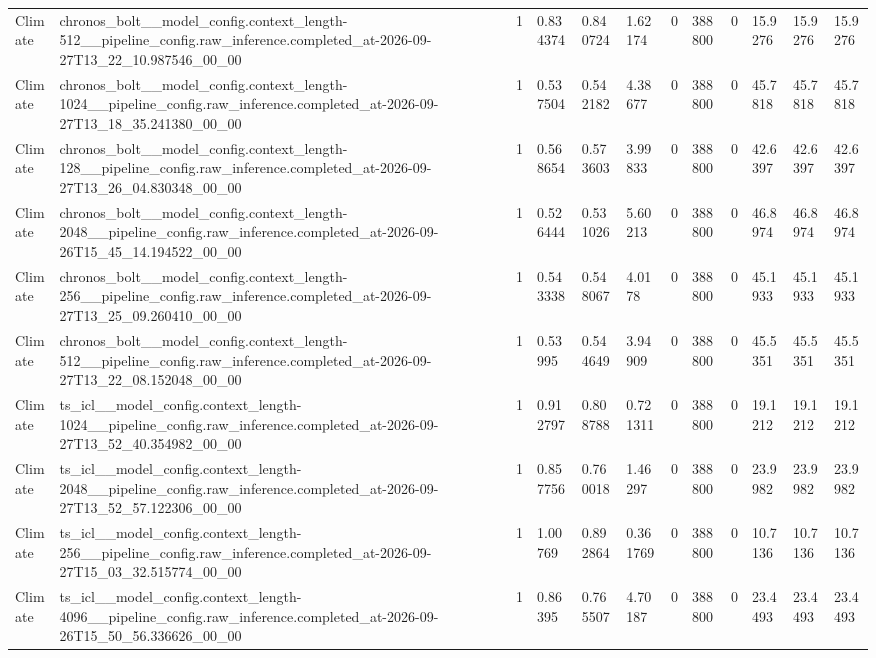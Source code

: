 \begin{tabular}{llllllllllll}
Climate & chronos\_bolt\_\_model\_config.context\_length-512\_\_pipeline\_config.raw\_inference.completed\_at-2026-09-27T13\_22\_10.987546\_00\_00 & 1 & 0.834374 & 0.840724 & 1.62174 & 0 & 388800 & 0 & 15.9276 & 15.9276 & 15.9276 \\
Climate & chronos\_bolt\_\_model\_config.context\_length-1024\_\_pipeline\_config.raw\_inference.completed\_at-2026-09-27T13\_18\_35.241380\_00\_00 & 1 & 0.537504 & 0.542182 & 4.38677 & 0 & 388800 & 0 & 45.7818 & 45.7818 & 45.7818 \\
Climate & chronos\_bolt\_\_model\_config.context\_length-128\_\_pipeline\_config.raw\_inference.completed\_at-2026-09-27T13\_26\_04.830348\_00\_00 & 1 & 0.568654 & 0.573603 & 3.99833 & 0 & 388800 & 0 & 42.6397 & 42.6397 & 42.6397 \\
Climate & chronos\_bolt\_\_model\_config.context\_length-2048\_\_pipeline\_config.raw\_inference.completed\_at-2026-09-26T15\_45\_14.194522\_00\_00 & 1 & 0.526444 & 0.531026 & 5.60213 & 0 & 388800 & 0 & 46.8974 & 46.8974 & 46.8974 \\
Climate & chronos\_bolt\_\_model\_config.context\_length-256\_\_pipeline\_config.raw\_inference.completed\_at-2026-09-27T13\_25\_09.260410\_00\_00 & 1 & 0.543338 & 0.548067 & 4.0178 & 0 & 388800 & 0 & 45.1933 & 45.1933 & 45.1933 \\
Climate & chronos\_bolt\_\_model\_config.context\_length-512\_\_pipeline\_config.raw\_inference.completed\_at-2026-09-27T13\_22\_08.152048\_00\_00 & 1 & 0.53995 & 0.544649 & 3.94909 & 0 & 388800 & 0 & 45.5351 & 45.5351 & 45.5351 \\
Climate & ts\_icl\_\_model\_config.context\_length-1024\_\_pipeline\_config.raw\_inference.completed\_at-2026-09-27T13\_52\_40.354982\_00\_00 & 1 & 0.912797 & 0.808788 & 0.721311 & 0 & 388800 & 0 & 19.1212 & 19.1212 & 19.1212 \\
Climate & ts\_icl\_\_model\_config.context\_length-2048\_\_pipeline\_config.raw\_inference.completed\_at-2026-09-27T13\_52\_57.122306\_00\_00 & 1 & 0.857756 & 0.760018 & 1.46297 & 0 & 388800 & 0 & 23.9982 & 23.9982 & 23.9982 \\
Climate & ts\_icl\_\_model\_config.context\_length-256\_\_pipeline\_config.raw\_inference.completed\_at-2026-09-27T15\_03\_32.515774\_00\_00 & 1 & 1.00769 & 0.892864 & 0.361769 & 0 & 388800 & 0 & 10.7136 & 10.7136 & 10.7136 \\
Climate & ts\_icl\_\_model\_config.context\_length-4096\_\_pipeline\_config.raw\_inference.completed\_at-2026-09-26T15\_50\_56.336626\_00\_00 & 1 & 0.86395 & 0.765507 & 4.70187 & 0 & 388800 & 0 & 23.4493 & 23.4493 & 23.4493 \\

\end{tabular}
